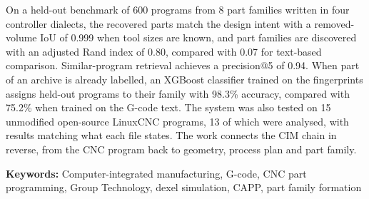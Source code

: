 \documentclass[11pt,a4paper]{article}
\begin{document}
On a held-out benchmark of 600 programs from 8 part families written in four controller dialects, the recovered parts match the design intent with a removed-volume IoU of 0.999 when tool sizes are known, and part families are discovered with an adjusted Rand index of 0.80, compared with 0.07 for text-based comparison. Similar-program retrieval achieves a precision@5 of 0.94. When part of an archive is already labelled, an XGBoost classifier trained on the fingerprints assigns held-out programs to their family with 98.3\% accuracy, compared with 75.2\% when trained on the G-code text. The system was also tested on 15 unmodified open-source LinuxCNC programs, 13 of which were analysed, with results matching what each file states. The work connects the CIM chain in reverse, from the CNC program back to geometry, process plan and part family.

\vspace{4pt}
\textbf{Keywords:} Computer-integrated manufacturing, G-code, CNC part programming, Group Technology, dexel simulation, CAPP, part family formation
\end{document}
